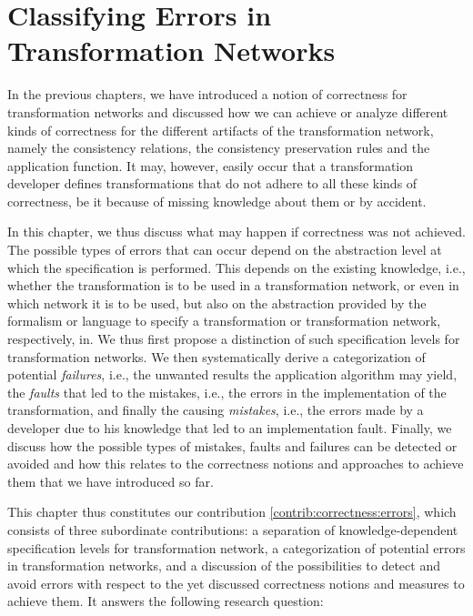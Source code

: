 \chapter{Classifying Errors in Transformation Networks 
}
\label{chap:errors}

In the previous chapters, we have introduced a notion of correctness for transformation networks and discussed how we can achieve or analyze different kinds of correctness for the different artifacts of the transformation network, namely the consistency relations, the consistency preservation rules and the application function.
It may, however, easily occur that a transformation developer defines transformations that do not adhere to all these kinds of correctness, be it because of missing knowledge about them or by accident.

In this chapter, we thus discuss what may happen if correctness was not achieved.
The possible types of errors that can occur depend on the abstraction level at which the specification is performed. 
This depends on the existing knowledge, i.e., whether the transformation is to be used in a transformation network, or even in which network it is to be used, but also on the abstraction provided by the formalism or language to specify a transformation or transformation network, respectively, in.
We thus first propose a distinction of such specification levels for transformation networks.
We then systematically derive a categorization of potential \emph{failures}, i.e., the unwanted results the application algorithm may yield, the \emph{faults} that led to the mistakes, i.e., the errors in the implementation of the transformation, and finally the causing \emph{mistakes}, i.e., the errors made by a developer due to his knowledge that led to an implementation fault.
Finally, we discuss how the possible types of mistakes, faults and failures can be detected or avoided and how this relates to the correctness notions and approaches to achieve them that we have introduced so far.

This chapter thus constitutes our contribution \autoref{contrib:correctness:errors}, which consists of three subordinate contributions: a separation of knowledge-dependent specification levels for transformation network, a categorization of potential errors in transformation networks, and a discussion of the possibilities to detect and avoid errors with respect to the yet discussed correctness notions and measures to achieve them.
It answers the following research question:

